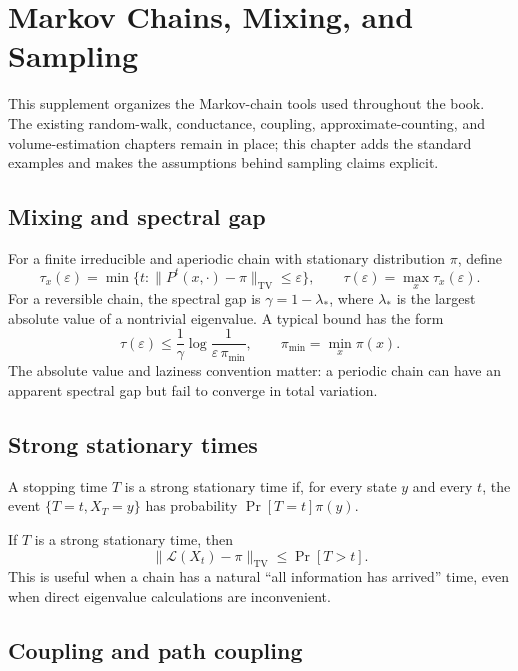 \chapter{Markov Chains, Mixing, and Sampling}
\label{ch:stage6-markov-sampling}

This supplement organizes the Markov-chain tools used throughout the book.
The existing random-walk, conductance, coupling, approximate-counting, and
volume-estimation chapters remain in place; this chapter adds the standard
examples and makes the assumptions behind sampling claims explicit.

\section{Mixing and spectral gap}

For a finite irreducible and aperiodic chain with stationary distribution
$\pi$, define
\[
 \tau_x(\varepsilon)=\min\{t:\|P^t(x,\cdot)-\pi\|_{\mathrm{TV}}\leq\varepsilon\},
 \qquad \tau(\varepsilon)=\max_x\tau_x(\varepsilon).
\]
For a reversible chain, the spectral gap is
$\gamma=1-\lambda_*$, where $\lambda_*$ is the largest absolute value of a
nontrivial eigenvalue.  A typical bound has the form
\[
 \tau(\varepsilon)\leq
 \frac{1}{\gamma}\log\frac{1}{\varepsilon\,\pi_{\min}},
 \qquad \pi_{\min}=\min_x\pi(x).
\]
The absolute value and laziness convention matter: a periodic chain can have
an apparent spectral gap but fail to converge in total variation.

\section{Strong stationary times}

\begin{definition}
A stopping time $T$ is a strong stationary time if, for every state $y$ and
every $t$, the event $\{T=t,X_T=y\}$ has probability
$\Pr[T=t]\pi(y)$.
\end{definition}

If $T$ is a strong stationary time, then
\[
 \|\mathcal{L}(X_t)-\pi\|_{\mathrm{TV}}\leq\Pr[T>t].
\]
This is useful when a chain has a natural ``all information has arrived''
time, even when direct eigenvalue calculations are inconvenient.

\section{Coupling and path coupling}

